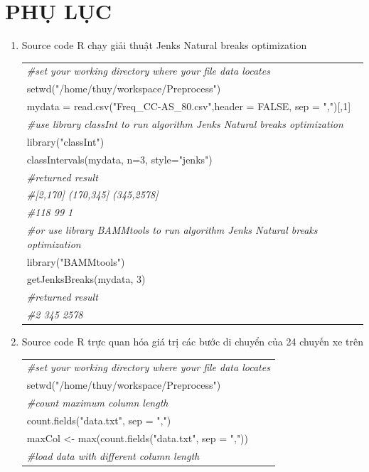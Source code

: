 \documentclass[a4paper, 13pt]{report}
\begin{document}
\chapter{PHỤ LỤC}
\begin{enumerate}
\item Source code R chạy giải thuật Jenks Natural breaks optimization
\begin{flushleft}
\begin{tabular}{ |l| }
\hline 
\textit{\#set your working directory where your file data locates}\\
setwd("/home/thuy/workspace/Preprocess")\\
mydata = read.csv("Freq\_CC-AS\_80.csv",header = FALSE, sep = ",")[,1]\\
\textit{\#use library classInt to run algorithm Jenks Natural breaks optimization}\\
library("classInt")\\
classIntervals(mydata, n=3, style="jenks")\\
\textit{\#returned result}\\
\textit{\#[2,170]  (170,345] (345,2578]}\\
\textit{\#118         99          1}\\
\textit{\#or use library BAMMtools to run algorithm Jenks Natural breaks optimization}\\
library("BAMMtools")\\
getJenksBreaks(mydata, 3)\\
\textit{\#returned result}\\
\textit{\#2  345 2578}\\
\hline
\end{tabular}
\end{flushleft}
\item Source code R trực quan hóa giá trị các bước di chuyển của 24 chuyến xe trên\\
\begin{flushleft}
\begin{tabular}{ |l| }
\hline 
\textit{\#set your working directory where your file data locates}\\
setwd("/home/thuy/workspace/Preprocess")\\
\textit{\#count maximum column length}\\
count.fields("data.txt", sep = ",")\\
maxCol <- max(count.fields("data.txt", sep = ","))\\
\textit{\#load data with different column length}\\

\end{tabular}
\end{flushleft}
\end{enumerate}
\end{document}
